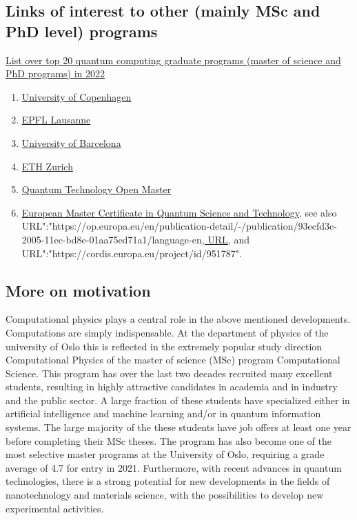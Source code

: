 \documentclass[%
oneside,                 %
final,                   %
10pt]{article}
\begin{document}
\subsection*{Links of interest to other (mainly MSc and PhD level) programs}

\href{{https://thequantuminsider.com/2022/06/06/top-20-quantum-computing-masters-ph-d-programs-in-2022/}}{List over top 20 quantum computing graduate programs (master of science and PhD programs) in 2022}

\begin{enumerate}
\item \href{{https://www.math.ku.dk/english/about/news/quantum-information-science-programme/}}{University of Copenhagen}

\item \href{{https://thequantumhubs.com/epfl-offers-a-new-master-in-quantum-science-and-engineering/}}{EPFL Lausanne}

\item \href{{https://quantummasterbarcelona.eu/}}{University of Barcelona}

\item \href{{https://master-qe.ethz.ch/}}{ETH Zurich}

\item \href{{https://qtom.qtedu.eu/}}{Quantum Technology Open Master}

\item \href{{http://efeqt.eu/}}{European Master Certificate in Quantum Science and Technology}, see also URL":"https://op.europa.eu/en/publication-detail/-/publication/93ecfd3c-2005-11ec-bd8e-01aa75ed71a1/language-en\href{{https://www.eucor-uni.org/en/qustec/}}{, URL}, and URL":"https://cordis.europa.eu/project/id/951787".
\end{enumerate}

\noindent
\subsection*{More on motivation}

Computational physics plays a central role in the above mentioned
developments.  Computations are simply indispensable.  At the
department of physics of the university of Oslo this is reflected in
the extremely popular study direction Computational Physics of the
master of science (MSc) program Computational Science. This program
has over the last two decades recruited many excellent students,
resulting in highly attractive candidates in academia and in industry
and the public sector. A large fraction of these students have
specialized either in artificial intelligence and machine learning
and/or in quantum information systems.  The large majority of the
these students have job offers at least one year before completing
their MSc theses. The program has also become one of the most
selective master programs at the University of Oslo, requiring a grade
average of 4.7 for entry in 2021. Furthermore, with recent advances in
quantum technologies, there is a strong potential for new developments
in the fields of nanotechnology and materials science, with the
possibilities to develop new experimental activities.
\end{document}
